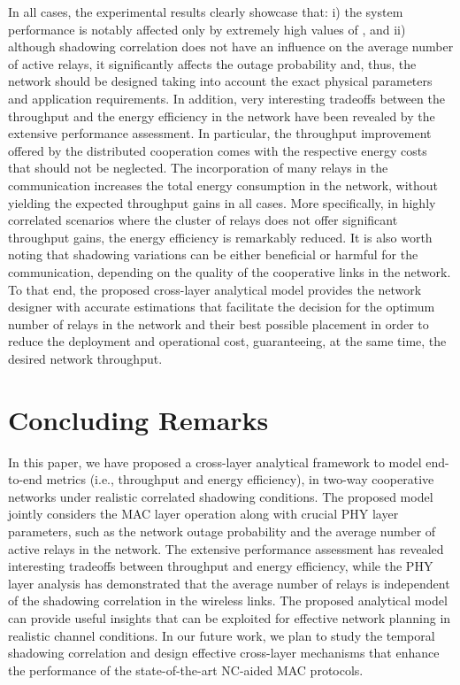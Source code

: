 \documentclass[12pt,draftcls, onecolumn]{IEEEtran}
\begin{document}
In all cases, the experimental results clearly showcase that: i) the system performance is notably affected only by extremely high values of , and ii) although shadowing correlation does not have an influence on the average number of active relays, it significantly affects the outage probability and, thus, the network should be designed taking into account the exact physical parameters and application requirements. In addition, very interesting tradeoffs between the throughput and the energy efficiency in the network have been revealed by the extensive performance assessment. In particular, the throughput improvement offered by the distributed cooperation comes with the respective energy costs that should not be neglected. The incorporation of many relays in the communication increases the total energy consumption in the network, without yielding the expected throughput gains in all cases. More specifically, in highly correlated scenarios where the cluster of relays does not offer significant throughput gains, the energy efficiency is remarkably reduced. It is also worth noting that shadowing variations can be either beneficial or harmful for the communication, depending on the quality of the cooperative links in the network. To that end, the proposed cross-layer analytical model provides the network designer with accurate estimations that facilitate the decision for the optimum number of relays in the network and their best possible placement in order to reduce the deployment and operational cost, guaranteeing, at the same time, the desired network throughput.


\section{Concluding Remarks}
\label{sec:conclusions}

In this paper, we have proposed a cross-layer analytical framework to model end-to-end metrics (i.e., throughput and energy efficiency), in two-way cooperative networks under realistic correlated shadowing conditions. The proposed model jointly considers the MAC layer operation along with crucial PHY layer parameters, such as the network outage probability and the average number of active relays in the network. The extensive performance assessment has revealed interesting tradeoffs between throughput and energy efficiency, while the PHY layer analysis has demonstrated that the average number of relays is independent of the shadowing correlation in the wireless links. The proposed analytical model can provide useful insights that can be exploited for effective network planning in realistic channel conditions. In our future work, we plan to study the temporal shadowing correlation and design effective cross-layer mechanisms that enhance the performance of the state-of-the-art NC-aided MAC protocols.
\end{document}
